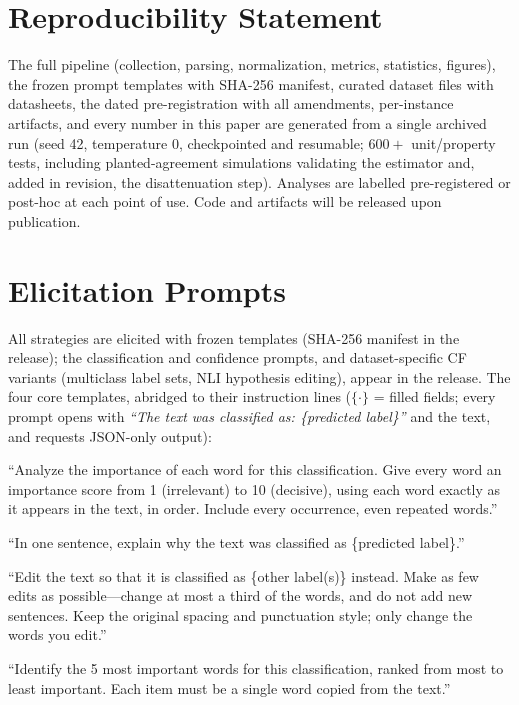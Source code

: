 \documentclass[11pt]{article}
\begin{document}
\section*{Reproducibility Statement}
The full pipeline (collection, parsing, normalization, metrics, statistics, figures), the frozen prompt templates with SHA-256 manifest, curated dataset files with datasheets, the dated pre-registration with all amendments, per-instance artifacts, and every number in this paper are generated from a single archived run (seed 42, temperature 0, checkpointed and resumable; $600{+}$ unit/property tests, including planted-agreement simulations validating the estimator and, added in revision, the disattenuation step). Analyses are labelled pre-registered or post-hoc at each point of use. Code and artifacts will be released upon publication.



\appendix

\section{Elicitation Prompts}
\label{app:prompts}

All strategies are elicited with frozen templates (SHA-256 manifest in the release); the classification and confidence prompts, and dataset-specific CF variants (multiclass label sets, NLI hypothesis editing), appear in the release. The four core templates, abridged to their instruction lines ($\{\cdot\}$ = filled fields; every prompt opens with \emph{``The text was classified as: \{predicted label\}''} and the text, and requests JSON-only output):

\begin{description}[leftmargin=1em,itemsep=2pt]
\item[H (highlighting).] ``Analyze the importance of each word for this classification. Give every word an importance score from 1 (irrelevant) to 10 (decisive), using each word exactly as it appears in the text, in order. Include every occurrence, even repeated words.''
\item[R (rationale).] ``In one sentence, explain why the text was classified as \{predicted label\}.''
\item[CF (counterfactual).] ``Edit the text so that it is classified as \{other label(s)\} instead. Make as few edits as possible---change at most a third of the words, and do not add new sentences. Keep the original spacing and punctuation style; only change the words you edit.''
\item[RO (rank ordering).] ``Identify the 5 most important words for this classification, ranked from most to least important. Each item must be a single word copied from the text.''
\end{description}
\end{document}
